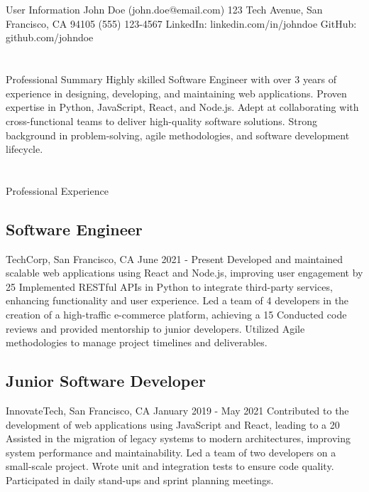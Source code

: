 \documentclass[10pt]{resume-template} %
\begin{document}
\section{\faUsers}{\Large User Information}
John Doe \hfill \faEnvelopeO(john.doe@email.com)
123 Tech Avenue, San Francisco, CA 94105 \hfill (555) 123-4567
\newline LinkedIn: linkedin.com/in/johndoe
\newline GitHub: github.com/johndoe

\section{\faPencilSolid}{\Large Professional Summary}
Highly skilled Software Engineer with over 3 years of experience in designing, developing, and maintaining web applications. Proven expertise in Python, JavaScript, React, and Node.js. Adept at collaborating with cross-functional teams to deliver high-quality software solutions. Strong background in problem-solving, agile methodologies, and software development lifecycle.

\section{\faCode}{\Large Professional Experience}
\subsection*{Software Engineer}
TechCorp, San Francisco, CA \hfill June 2021 - Present
Developed and maintained scalable web applications using React and Node.js, improving user engagement by 25%
Implemented RESTful APIs in Python to integrate third-party services, enhancing functionality and user experience.
Led a team of 4 developers in the creation of a high-traffic e-commerce platform, achieving a 15%
Conducted code reviews and provided mentorship to junior developers.
Utilized Agile methodologies to manage project timelines and deliverables.

\subsection*{Junior Software Developer}
InnovateTech, San Francisco, CA \hfill January 2019 - May 2021
Contributed to the development of web applications using JavaScript and React, leading to a 20%
Assisted in the migration of legacy systems to modern architectures, improving system performance and maintainability.
Led a team of two developers on a small-scale project.
Wrote unit and integration tests to ensure code quality.
Participated in daily stand-ups and sprint planning meetings.
\end{document}
